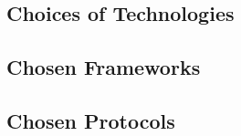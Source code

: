 \documentclass[12pt]{article}
\begin{document}
		\subsection{Choices of Technologies}
			\vspace{0.2in}
		
		
		\subsection{Chosen Frameworks}
					\vspace{0.2in}	
			
		
		\subsection{Chosen Protocols}
\end{document}
